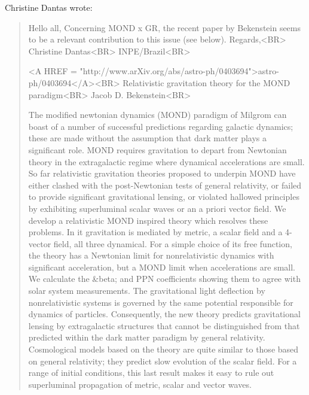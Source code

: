 Christine Dantas wrote:

\begin{quote}
Hello all,
Concerning MOND x GR, the recent paper by Bekenstein seems to be 
a relevant contribution to this issue (see below).
Regards,<BR>
Christine Dantas<BR>
INPE/Brazil<BR>

<A HREF = "http://www.arXiv.org/abs/astro-ph/0403694">astro-ph/0403694</A><BR>  
Relativistic gravitation theory for the MOND paradigm<BR>
Jacob D. Bekenstein<BR>

The modified newtonian dynamics (MOND) paradigm of Milgrom can boast
of a number of successful predictions regarding galactic dynamics;
these are made without the assumption that dark matter plays a
significant role. MOND requires gravitation to depart from Newtonian
theory in the extragalactic regime where dynamical accelerations are
small. So far relativistic gravitation theories proposed to underpin
MOND have either clashed with the post-Newtonian tests of general
relativity, or failed to provide significant gravitational lensing, or
violated hallowed principles by exhibiting superluminal scalar waves
or an a priori vector field. We develop a relativistic MOND inspired
theory which resolves these problems. In it gravitation is mediated by
metric, a scalar field and a 4-vector field, all three dynamical. For
a simple choice of its free function, the theory has a Newtonian limit
for nonrelativistic dynamics with significant acceleration, but a MOND
limit when accelerations are small. We calculate the &beta; and \gamma 
PPN coefficients showing them to agree with solar system
measurements. The gravitational light deflection by nonrelativistic
systems is governed by the same potential responsible for dynamics of
particles. Consequently, the new theory predicts gravitational lensing
by extragalactic structures that cannot be distinguished from that
predicted within the dark matter paradigm by general
relativity. Cosmological models based on the theory are quite similar
to those based on general relativity; they predict slow evolution of
the scalar field. For a range of initial conditions, this last result
makes it easy to rule out superluminal propagation of metric, scalar
and vector waves.
\end{quote}

